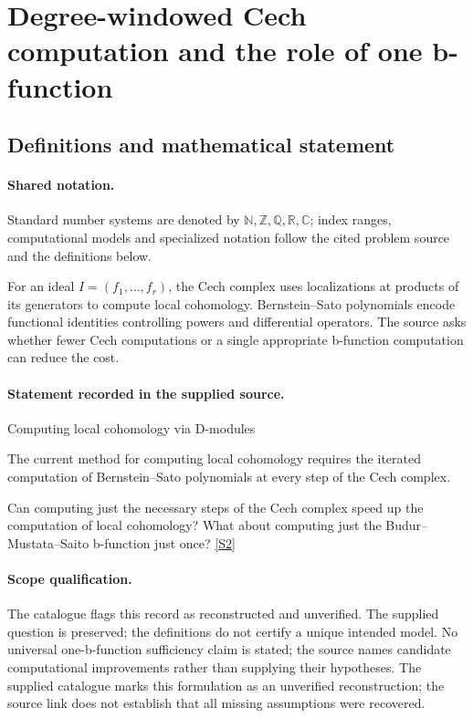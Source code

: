 \documentclass[11pt]{article}
\newcommand{\sref}[2]{\hyperlink{source:#1:#2}{[S#2]}}
\begin{document}
\section{Degree-windowed Cech computation and the role of one b-function}\label{statement}

\subsection{Definitions and mathematical statement}

\paragraph{Shared notation.}Standard number systems are denoted by $\mathbb N,\mathbb Z,\mathbb Q,\mathbb R,\mathbb C$; index ranges, computational models and specialized notation follow the cited problem source and the definitions below.


For an ideal $I=(f_1,\ldots,f_r)$, the Cech complex uses localizations at products of its generators to compute local cohomology. Bernstein--Sato polynomials encode functional identities controlling powers and differential operators. The source asks whether fewer Cech computations or a single appropriate b-function computation can reduce the cost.
\paragraph{Statement recorded in the supplied source.}
Computing local cohomology via D-modules

The current method for computing local cohomology requires the iterated computation of Bernstein--Sato polynomials at every step of the Cech complex.

Can computing just the necessary steps of the Cech complex speed up the computation of local cohomology? What about computing just the Budur--Mustata--Saito b-function just once? \sref{statement}{2}
\paragraph{Scope qualification.}
The catalogue flags this record as reconstructed and unverified. The supplied question is preserved; the definitions do not certify a unique intended model. No universal one-b-function sufficiency claim is stated; the source names candidate computational improvements rather than supplying their hypotheses.
The supplied catalogue marks this formulation as an unverified reconstruction; the source link does not establish that all missing assumptions were recovered.
\end{document}
